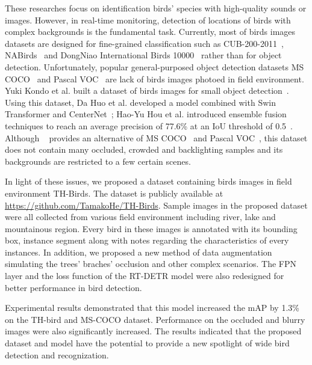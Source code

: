 These researches focus on identification birds' species with 
high-quality sounds or images. However, in real-time monitoring, 
detection of locations of birds with complex backgrounds is the 
fundamental task. Currently, most of birds images datasets 
are designed for fine-grained classification such as CUB-200-2011~\cite{dataset1}, NABirds~\cite{dataset2} and DongNiao International Birds 10000~\cite{dataset3}
rather than for object detection. Unfortunately, 
popular general-purposed object detection datasets MS COCO~\cite{datasetcoco} and Pascal VOC~\cite{datasetvoc} 
are lack of birds images photoed in field environment.
Yuki Kondo et al. built a dataset of birds images for small object detection~\cite{datasetmva}.
Using this dataset, Da Huo et al. developed a model 
combined with Swin Transformer and CenterNet~;
Hao-Yu Hou et al. introduced ensemble fusion techniques to reach 
an average precision of 77.6\% at an IoU threshold of 0.5~\cite{Swint,centernet,mva1,mva2}.
Although ~\cite{datasetmva} provides an alternative of MS COCO~\cite{datasetcoco} and Pascal VOC~\cite{datasetvoc},
this dataset does not contain many occluded, crowded and backlighting 
samples and its backgrounds are restricted to a few certain scenes.

In light of these issues, we proposed a dataset 
containing birds images in field environment TH-Birds. 
The dataset is publicly available at \href{https://github.com/TamakoHe/TH-Birds}{https://github.com/TamakoHe/TH-Birds}. 
Sample images in the proposed dataset were all collected from various field environment including river, lake and mountainous region. Every bird in these images is annotated with its bounding box, instance segment along with notes
regarding the characteristics of every instances.  In addition, we proposed 
a new method of data augmentation simulating the trees' braches' occlusion 
and other complex scenarios. The FPN layer and the loss function of the 
RT-DETR model were also redesigned for better performance in bird detection. 

Experimental results demonstrated that this model increased the mAP by 
1.3\% on the TH-bird and MS-COCO dataset. Performance on the occluded 
and blurry images were also significantly increased. The results indicated 
that the proposed dataset and model have the potential to provide a new spotlight
of wide bird detection and recognization. 